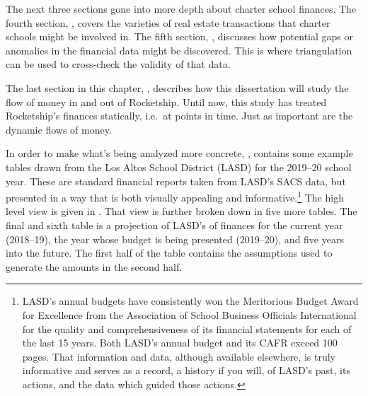 
The next three sections gone into more depth about charter school finances. The fourth section, , covers the varieties of real estate transactions that charter schools might be involved in. The fifth section, , discusses how potential gaps or anomalies in the financial data might be discovered. This is where triangulation can be used to cross-check the validity of that data. %

The last section in this chapter, , describes how this dissertation will study the flow of money in and out of Rocketship. Until now, this study has treated Rocketship's finances statically, i.e.~at points in time. Just as
important are the dynamic flows of money. %

In order to make what's being analyzed more concrete, , contains some example tables drawn from the Los Altos School District (LASD) for the 2019–20 school year. These are standard financial reports taken from LASD's SACS data, but presented in a way that is both visually appealing and informative.\footnote{LASD's annual budgets have consistently won the Meritorious Budget Award for Excellence from the Association of School Business Officials International for the quality and comprehensiveness of its financial statements for each of the last 15 years. Both LASD's annual budget and its CAFR exceed 100 pages. That information and data, although available elsewhere, is truly informative and serves as a record, a history if you will, of LASD's past, its actions, and the data which guided those actions.} The high level view is given in . That view is further broken down in five more tables. The final and sixth table is a projection of LASD's of finances for the current year (2018–19), the year whose budget is being presented (2019–20), and five years into the future. The first half of the table contains the assumptions used to generate the amounts in the second half.


